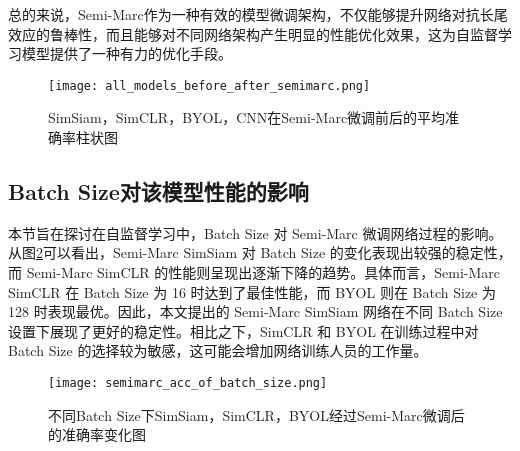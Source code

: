 \documentclass[master]{thesis-uestc}
\begin{document}
总的来说，Semi-Marc作为一种有效的模型微调架构，不仅能够提升网络对抗长尾效应的鲁棒性，而且能够对不同网络架构产生明显的性能优化效果，这为自监督学习模型提供了一种有力的优化手段。

\begin{figure}[h]
    \centering
    \texttt{[image: all\_models\_before\_after\_semimarc.png]}
    \caption{SimSiam，SimCLR，BYOL，CNN在Semi-Marc微调前后的平均准确率柱状图}
    \label{all_models_before_after_semimarc}
\end{figure}

\subsection{Batch Size对该模型性能的影响}
本节旨在探讨在自监督学习中，Batch Size 对 Semi-Marc 微调网络过程的影响。从图\ref{semimarc_acc_of_batch_size}可以看出，Semi-Marc SimSiam 对 Batch Size 的变化表现出较强的稳定性，而 Semi-Marc SimCLR 的性能则呈现出逐渐下降的趋势。具体而言，Semi-Marc SimCLR 在 Batch Size 为 16 时达到了最佳性能，而 BYOL 则在 Batch Size 为 128 时表现最优。因此，本文提出的 Semi-Marc SimSiam 网络在不同 Batch Size 设置下展现了更好的稳定性。相比之下，SimCLR 和 BYOL 在训练过程中对 Batch Size 的选择较为敏感，这可能会增加网络训练人员的工作量。

\begin{figure}[h]
    \centering
    \texttt{[image: semimarc\_acc\_of\_batch\_size.png]}
    \caption{不同Batch Size下SimSiam，SimCLR，BYOL经过Semi-Marc微调后的准确率变化图}
    \label{semimarc_acc_of_batch_size}
\end{figure}

\end{document}
